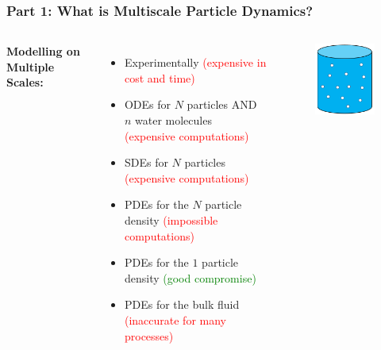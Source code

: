 \documentclass[aspectratio=169,xcolor=dvipsnames]{beamer}
\begin{document}
\begin{frame}
	\frametitle{Part 1: What is Multiscale Particle Dynamics?}
	\begin{columns}
		\textbf{Modelling on Multiple Scales:}
		\vspace{0.4cm}
		\begin{itemize}
			\item Experimentally \textcolor{red}{(expensive in cost and time)}
			\item ODEs for $N$ particles AND $n$ water molecules\\ \textcolor{red}{(expensive computations)}
			\item SDEs for $N$ particles \textcolor{red}{(expensive computations)}
			\item PDEs for the $N$ particle density  \textcolor{red}{(impossible computations)}
			\item PDEs for the $1$ particle density \textcolor{green}{(good compromise)}
			\item PDEs for the bulk fluid \textcolor{red}{(inaccurate for many processes)}
		\end{itemize}
	
	\begin{figure}
		\includegraphics[width=4cm]{Particles3.png}
	\end{figure}
	\end{columns}
\end{frame}
\end{document}
